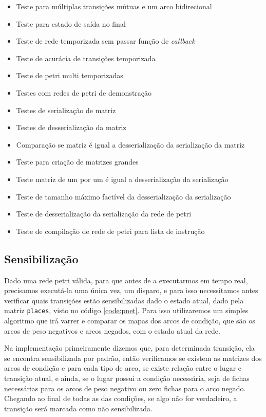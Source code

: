 \begin{itemize}
	\item Teste para múltiplas transições mútuas e um arco bidirecional
	\item Teste para estado de saída no final
	\item Teste de rede temporizada sem passar função de \textit{callback}
	\item Teste de acurácia de transições temporizada
	\item Teste de petri multi temporizadas
	\item Testes com redes de petri de demonstração
	\item Testes de serialização de matriz
	\item Testes de desserialização da matriz
	\item Comparação se matriz é igual a desserialização da serialização da matriz
	\item Teste para criação de matrizes grandes
	\item Teste matriz de um por um é igual a desserialização da serialização
	\item Teste de tamanho máximo factível da desserialização da serialização
	\item Teste de desserialização da serialização da rede de petri
	\item Teste de compilação de rede de petri para lista de instrução
\end{itemize}

\subsection{Sensibilização}

Dado uma rede petri válida, para que antes de a executarmos em tempo real, precisamos executá-la uma única vez, um disparo, e para isso necessitamos antes verificar quais transições estão sensibilizadas dado o estado atual, dado pela matriz \lstinline{places}, visto no código \ref{code:pnet}. Para isso utilizaremos um simples algoritmo que irá varrer e comparar os mapas dos arcos de condição, que são os arcos de peso negativos e arcos negados, com o estado atual da rede.



Na implementação primeiramente dizemos que, para determinada transição, ela se encontra sensibilizada por padrão, então verificamos se existem as matrizes dos arcos de condição e para cada tipo de arco, se existe relação entre o lugar e transição atual, e ainda, se o lugar possui a condição necessária, seja de fichas necessárias para os arcos de peso negativo ou zero fichas para o arco negado. Chegando ao final de todas as das condições, se algo não for verdadeiro, a transição será marcada como não sensibilizada.

